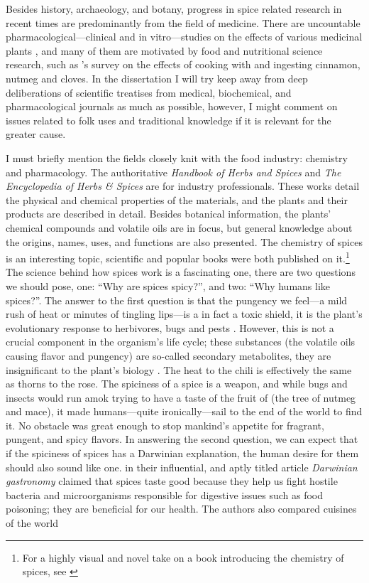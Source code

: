 Besides history, archaeology, and botany, progress in spice related research in recent times are predominantly from the field of medicine. There are uncountable pharmacological---clinical and in vitro---studies on the effects of various medicinal plants \autocite{boy_recommended_2018}, and many of them are motivated by food and nutritional science research, such as \textcite{baker_impact_2013}'s survey on the effects of cooking with and ingesting cinnamon, nutmeg and cloves. In the dissertation I will try keep away from deep deliberations of scientific treatises from medical, biochemical, and pharmacological journals as much as possible, however, I might  comment on issues related to folk uses and traditional knowledge if it is relevant for the greater cause.

I must briefly mention the fields closely knit with the food industry: chemistry and pharmacology. The authoritative \textit{Handbook of Herbs and Spices} \autocite{peter_handbook_2012} and \textit{The Encyclopedia of Herbs \& Spices} \autocite{ravindran_encyclopedia_2017} are for industry professionals. These works detail the physical and chemical properties of the materials, and the plants and their products are described in detail. Besides botanical information, the plants' chemical compounds and volatile oils are in focus, but general knowledge about the origins, names, uses, and functions are also presented. The chemistry of spices is an interesting topic, scientific and popular books were both published on it.\footnote{For a highly visual and novel take on a book introducing the chemistry of spices, see \textcite{farrimond_science_2018}} The science behind how spices work is a fascinating one, there are two questions we should pose, one: ``Why are spices spicy?'', and two: ``Why humans like spices?''. The answer to the first question is that the pungency we feel---a mild rush of heat or minutes of tingling lips---is a in fact a toxic shield, it is the plant's evolutionary response to herbivores, bugs and pests \autocite[21]{turner_spice_2004}. However, this is not a crucial component in the organism's life cycle; these substances (the volatile oils causing flavor and pungency) are so-called secondary metabolites, they are insignificant to the plant's biology \autocite[18]{parthasarathy_chemistry_2008}. The heat to the chili is effectively the same as thorns to the rose. The spiciness of a spice is a weapon, and while bugs and insects would run amok trying to have a taste of the fruit of  (the tree of nutmeg and mace), it made humans---quite ironically---sail to the end of the world to find it. No obstacle was great enough to stop mankind's appetite for fragrant, pungent, and spicy flavors. In answering the second question, we can expect that if the spiciness of spices has a Darwinian explanation, the human desire for them should also sound like one. \textcite{sherman_darwinian_1999} in their influential, and aptly titled article \textit{Darwinian gastronomy} claimed that spices taste good because they help us fight hostile bacteria and microorganisms responsible for digestive issues such as food poisoning; they are beneficial for our health. The authors also compared cuisines of the world 